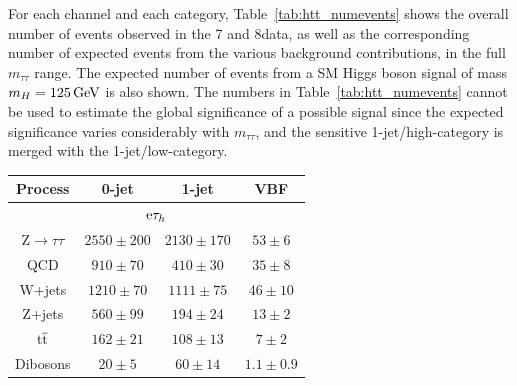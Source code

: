 \documentclass[12pt,twoside,a4paper,cmspaper,final,collab]{cms-tdr}
\begin{document}
For each channel and each category, Table~\ref{tab:htt_numevents} shows the overall number of events observed  in the 7 and 8\TeV data,
as well as the corresponding number of expected events from the various background contributions, in the full $m_{\tau\tau}$ range.
The expected number of events from a SM Higgs boson signal of mass $m_H=125\,\text{Ge\hspace{-.08em}V}$ is also shown.
The numbers in Table~\ref{tab:htt_numevents} cannot be used to estimate the global significance of a possible signal since
the expected significance varies considerably with $m_{\tau\tau}$, and the sensitive 1-jet/high-\PT category is merged with the 1-jet/low-\PT category.


\begin{table}[!hp]
\begin{center}
\begin{tabular}{c|c|c|c}
  \hline
  Process & 0-jet & 1-jet & VBF \\
  \hline
  \hline
  \multicolumn{4}{c}{$\mathrm{e}\tau_h$} \\
  \hline
  Z$\to\tau\tau$ & $2550 \pm 200$ & $2130 \pm 170$ & $53 \pm 6$ \\
QCD & $910 \pm 70$ & $410 \pm 30$ & $35 \pm 8$ \\
W+jets & $1210 \pm 70$ & $1111 \pm 75$ & $46 \pm 10$ \\
Z+jets & $560 \pm 99$ & $194 \pm 24$ & $13 \pm 2$ \\
$\mathrm{t}\overline{\mathrm{t}}$ & $162 \pm 21$ & $108 \pm 13$ & $7 \pm 2$ \\
Dibosons & $20 \pm 5$ & $60 \pm 14$ & $1.1 \pm 0.9$ \\


\end{tabular}
\end{center}
\end{table}
\end{document}
